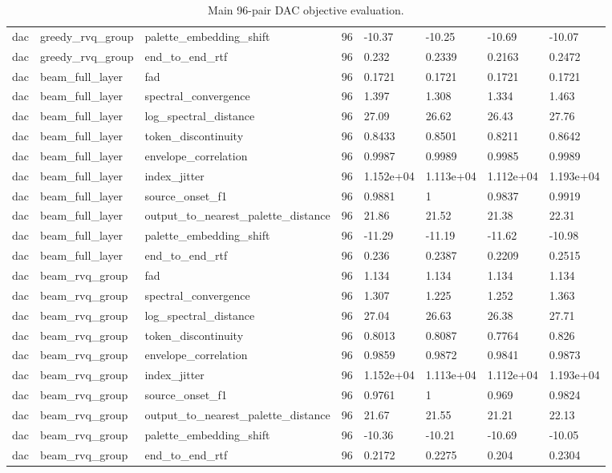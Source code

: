 \begin{table}[t]
\begin{tabular}{llllllll}
dac & greedy\_rvq\_group & palette\_embedding\_shift & 96 & -10.37 & -10.25 & -10.69 & -10.07 \\
dac & greedy\_rvq\_group & end\_to\_end\_rtf & 96 & 0.232 & 0.2339 & 0.2163 & 0.2472 \\
dac & beam\_full\_layer & fad & 96 & 0.1721 & 0.1721 & 0.1721 & 0.1721 \\
dac & beam\_full\_layer & spectral\_convergence & 96 & 1.397 & 1.308 & 1.334 & 1.463 \\
dac & beam\_full\_layer & log\_spectral\_distance & 96 & 27.09 & 26.62 & 26.43 & 27.76 \\
dac & beam\_full\_layer & token\_discontinuity & 96 & 0.8433 & 0.8501 & 0.8211 & 0.8642 \\
dac & beam\_full\_layer & envelope\_correlation & 96 & 0.9987 & 0.9989 & 0.9985 & 0.9989 \\
dac & beam\_full\_layer & index\_jitter & 96 & 1.152e+04 & 1.113e+04 & 1.112e+04 & 1.193e+04 \\
dac & beam\_full\_layer & source\_onset\_f1 & 96 & 0.9881 & 1 & 0.9837 & 0.9919 \\
dac & beam\_full\_layer & output\_to\_nearest\_palette\_distance & 96 & 21.86 & 21.52 & 21.38 & 22.31 \\
dac & beam\_full\_layer & palette\_embedding\_shift & 96 & -11.29 & -11.19 & -11.62 & -10.98 \\
dac & beam\_full\_layer & end\_to\_end\_rtf & 96 & 0.236 & 0.2387 & 0.2209 & 0.2515 \\
dac & beam\_rvq\_group & fad & 96 & 1.134 & 1.134 & 1.134 & 1.134 \\
dac & beam\_rvq\_group & spectral\_convergence & 96 & 1.307 & 1.225 & 1.252 & 1.363 \\
dac & beam\_rvq\_group & log\_spectral\_distance & 96 & 27.04 & 26.63 & 26.38 & 27.71 \\
dac & beam\_rvq\_group & token\_discontinuity & 96 & 0.8013 & 0.8087 & 0.7764 & 0.826 \\
dac & beam\_rvq\_group & envelope\_correlation & 96 & 0.9859 & 0.9872 & 0.9841 & 0.9873 \\
dac & beam\_rvq\_group & index\_jitter & 96 & 1.152e+04 & 1.113e+04 & 1.112e+04 & 1.193e+04 \\
dac & beam\_rvq\_group & source\_onset\_f1 & 96 & 0.9761 & 1 & 0.969 & 0.9824 \\
dac & beam\_rvq\_group & output\_to\_nearest\_palette\_distance & 96 & 21.67 & 21.55 & 21.21 & 22.13 \\
dac & beam\_rvq\_group & palette\_embedding\_shift & 96 & -10.36 & -10.21 & -10.69 & -10.05 \\
dac & beam\_rvq\_group & end\_to\_end\_rtf & 96 & 0.2172 & 0.2275 & 0.204 & 0.2304 \\
\bottomrule
\end{tabular}
\caption{Main 96-pair DAC objective evaluation.}
\label{tab:dac-main-full96}
\end{table}